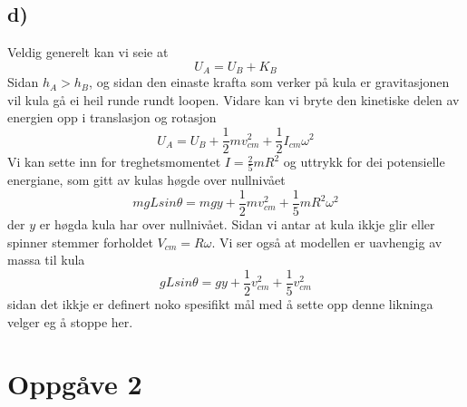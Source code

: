 \documentclass[12pt,a4paper]{article}
\begin{document}
    \subsection*{d)}
    Veldig generelt kan vi seie at 
    \begin{equation}
      U_A = U_B + K_B
    \end{equation}
    Sidan $h_A > h_B$, og sidan den einaste krafta som verker på kula er gravitasjonen vil kula
    gå ei heil runde rundt loopen. Vidare kan vi bryte den kinetiske delen av energien opp i
    translasjon og rotasjon
    \begin{equation}
      U_A = U_B + \frac{1}{2}mv_{cm}^2 + \frac{1}{2}I_{cm}\omega^2
    \end{equation}
    Vi kan sette inn for treghetsmomentet $I=\frac{2}{5}mR^2$ og uttrykk for dei potensielle
    energiane, som gitt av kulas høgde over nullnivået
    \begin{equation}
      mgLsin\theta = mgy + \frac{1}{2}mv_{cm}^2 + \frac{1}{5}mR^2\omega^2
    \end{equation}
    der $y$ er høgda kula har over nullnivået. Sidan vi antar at kula ikkje
    glir eller spinner stemmer forholdet $V_{cm} = R\omega$. Vi ser også at
    modellen er uavhengig av massa til kula
    \begin{equation}
      gLsin\theta = gy + \frac{1}{2}v_{cm}^2 + \frac{1}{5}v_{cm}^2
    \end{equation}
    sidan det ikkje er definert noko spesifikt mål med å sette opp denne likninga velger
    eg å stoppe her.

  \section*{Oppgåve 2}
\end{document}
